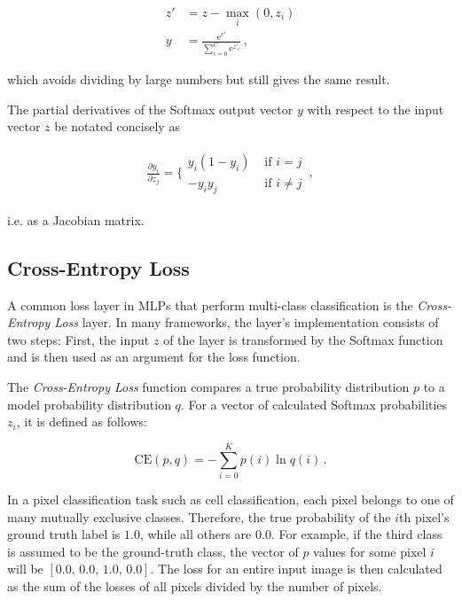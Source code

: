 \begin {align}
	z' &= z - \max \limits_{i}(0, z_i)\\
	y &= \frac{\text{e}^{c'}}{\sum_{c=0}^{C} \text{e}^{z'_{{c}}}} \,,
\end {align}

\noindent which avoids dividing by large numbers but still gives the same result. \cite[p. 81]{deeplearning_book}

The partial derivatives of the Softmax output vector $y$ with respect to the input vector $z$ be notated concisely as

\begin {align}
	\frac{\partial y_i}{\partial z_j} = \bigg \{ \begin {array}{ll}
								y_i(1 - y_i)& \text{ if } i = j \\
								-y_i y_j& \text{ if } i \neq j
							\end{array} \,,
	\label{eq:softmax_deriv}
\end {align}

i.e. as a Jacobian matrix. \cite[]{bishop_pattern}


		\subsection{Cross-Entropy Loss}
\label{subsec:cross_ent}

A common loss layer in MLPs that perform multi-class classification is the \textit{Cross-Entropy Loss} layer. In many frameworks, the layer's implementation consists of two steps: First, the input $z$ of the layer is transformed by the Softmax function and is then used as an argument for the loss function.

The \textit{Cross-Entropy Loss} function compares a true probability distribution $p$ to a model probability distribution $q$. For a vector of calculated Softmax probabilities $z_i$, it is defined as follows:

\[ \text{CE}(p, q) = -\sum \limits_{i = 0}^{K} p(i) \ln q(i) \,. \]

\noindent In a pixel classification task such as cell classification, each pixel belongs to one of many mutually exclusive classes. Therefore, the true probability of the $i$th pixel's ground truth label is $1.0$, while all others are $0.0$. For example, if the third class is assumed to be the ground-truth class, the vector of $p$ values for some pixel $i$ will be $[0.0,\, 0.0,\, 1.0,\, 0.0]$. The loss for an entire input image is then calculated as the sum of the losses of all pixels divided by the number of pixels.\\

